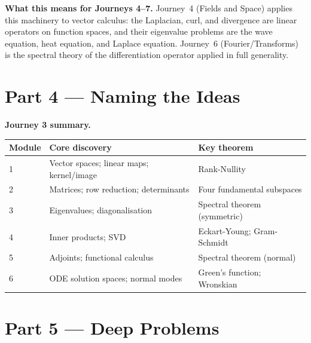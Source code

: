 \documentclass[12pt,a4paper]{article}
\newcounter{problem}
\begin{document}
\begin{discoverybox}
\medskip
\textbf{What this means for Journeys 4--7.} Journey~4 (Fields and Space) applies this machinery to vector calculus: the Laplacian, curl, and divergence are linear operators on function spaces, and their eigenvalue problems are the wave equation, heat equation, and Laplace equation. Journey~6 (Fourier/Transforms) is the spectral theory of the differentiation operator applied in full generality.
\end{discoverybox}

\section{Part 4 \texorpdfstring{---}{--} Naming the Ideas}

\begin{namebox}
\textbf{Journey 3 summary.}
\medskip
\begin{center}
\renewcommand{\arraystretch}{1.5}
\begin{tabular}{l l l}
\toprule
\textbf{Module} & \textbf{Core discovery} & \textbf{Key theorem} \\
\midrule
1 & Vector spaces; linear maps; kernel/image & Rank-Nullity \\
2 & Matrices; row reduction; determinants & Four fundamental subspaces \\
3 & Eigenvalues; diagonalisation & Spectral theorem (symmetric) \\
4 & Inner products; SVD & Eckart-Young; Gram-Schmidt \\
5 & Adjoints; functional calculus & Spectral theorem (normal) \\
6 & ODE solution spaces; normal modes & Green's function; Wronskian \\
\bottomrule
\end{tabular}
\end{center}
\end{namebox}

\section{Part 5 \texorpdfstring{---}{--} Deep Problems}
\end{document}
